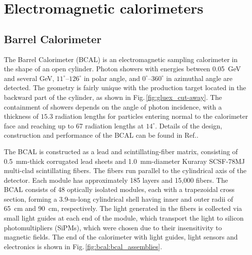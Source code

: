 \section[Electromagnetic calorimeters] {Electromagnetic calorimeters \label{sec:calorimeters}}

\subsection[Barrel Calorimeter ]{Barrel Calorimeter \label{sec:bcal}}
The Barrel Calorimeter (BCAL) is an electromagnetic sampling calorimeter in the shape of an open cylinder. Photon showers with energies between 0.05~GeV and several GeV, $11^{\circ}$--$126^{\circ}$ in polar angle, and $0^{\circ}$--$360^{\circ}$ in azimuthal angle are detected. The geometry is fairly unique with the production target located in the backward part of the cylinder, as shown in Fig.\,\ref{fig:gluex_cut-away}. The containment of showers depends on the angle of photon incidence, with a thickness of $15.3$ radiation lengths for particles entering normal to the calorimeter face and reaching up to 67 radiation lengths at $14^{\circ}$. Details of the design, construction and performance of the BCAL can be found in Ref.\cite{BEATTIE201824}.

The BCAL is constructed as a lead and  scintillating-fiber matrix, consisting of 0.5~mm-thick corrugated lead sheets and 1.0~mm-diameter Kuraray SCSF-78MJ multi-clad scintillating fibers. The fibers run parallel to the cylindrical axis of the detector. Each module has approximately 185 layers and 15,000 fibers. The BCAL consists of 48 optically isolated modules, each with a trapezoidal cross section, forming a  3.9-m-long cylindrical shell having inner and outer radii of 65~cm and 90~cm, respectively. The light generated in the fibers is collected via small light guides at each end of the module, which transport the light to silicon photomultipliers (SiPMs), which were chosen due to their insensitivity to magnetic fields. The end of the calorimeter with light guides, light sensors and electronics is shown in  Fig.\,\ref{fig:bcal:bcal_assemblies}.


